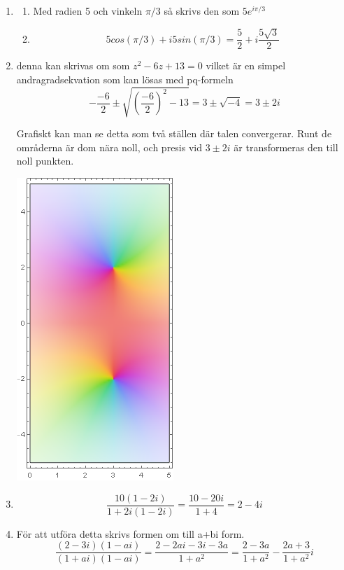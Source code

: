\documentclass[a4paper,12pt]{article}
\begin{document}
\begin{enumerate}
\begin{enumerate}
          \end{enumerate}
          \item \begin{enumerate}
                \item Med radien 5 och vinkeln $\pi/3$ så 
                skrivs den som $5e^{i\pi/3}$

                \item $$5cos(\pi/3)+i5sin(\pi/3)=\frac{5}{2}+i\frac{5\sqrt{3}}{2}$$
          \end{enumerate}

          \item denna kan skrivas om som 
          $z^2-6z+13=0$ vilket är en simpel andragradsekvation som
          kan lösas med pq-formeln 
          $$-\frac{-6}{2}\pm\sqrt{(\frac{-6}{2})^2-13}=3\pm\sqrt{-4}=3\pm 2i$$
          
          Grafiskt kan man se detta som två ställen där talen convergerar.
          Runt de områderna är dom nära noll, och presis vid $3\pm 2i$ är 
          transformeras den till noll punkten.
          \begin{center}
                \includegraphics[scale=0.6]{Figur 2.png}
          \end{center}
          \item 
          $$\frac{10(1-2i)}{1+2i(1-2i)}=\frac{10-20i}{1+4}=2-4i$$

          \item För att utföra detta skrivs formen om till a+bi form.
          $$\frac{(2-3i)(1-ai)}{(1+ai)(1-ai)}=\frac{2-2ai-3i-3a}{1+a^2}=\frac{2-3a}{1+a^2}-\frac{2a+3}{1+a^2}i$$


\end{enumerate}
\end{document}
